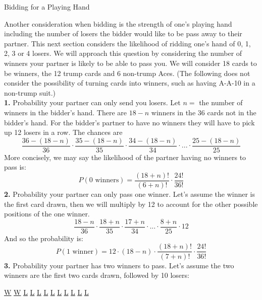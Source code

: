 \documentclass[11pt]{article}
\begin{document}
\begin{center}
  Bidding for a Playing Hand
\end{center}
\indent
Another consideration when bidding is the strength of one's playing hand including the number of losers the bidder would like to be pass away to their partner. This next section considers the likelihood of ridding one's hand of 0, 1, 2, 3 or 4 losers. We will approach this question by considering the number of winners your partner is likely to be able to pass you. We will consider 18 cards to be winners, the 12 trump cards and 6 non-trump Aces. (The following does not consider the possibility of turning cards into winners, such as having A-A-10 in a non-trump suit.)\\
\indent \textbf{\textbf{1.}} Probability your partner can only send you losers. Let $n=$ the number of winners in the bidder's hand. There are $18-n$ winners in the 36 cards not in the bidder's hand. For the bidder's partner to have no winners they will have to pick up 12 losers in a row. The chances are
\begin{equation}
  \frac{36-(18-n)}{36} \cdot \frac{35-(18-n)}{35}\cdot \frac{34-(18-n)}{34}\cdot ...\cdot \frac{25-(18-n)}{25}
\end{equation}
More concisely, we may say the likelihood of the partner having no winners to pass is:
\begin{equation}
 P(0\text{ winners})= \frac{(18+n)!}{(6+n)!}\cdot \frac{24!}{36!}
\end{equation}
\indent \textbf{2.} Probability your partner can only pass one winner. Let's assume the winner is the first card drawn, then we will multiply by 12 to account for the other possible positions of the one winner.
\begin{equation}
\frac{18-n}{36}\cdot \frac{18+n}{35}\cdot \frac {17+n}{34}\cdot ...\cdot \frac{8+n}{25} \cdot 12
\end {equation}
And so the probability is:
\begin{equation}
 P(1 \text{ winner})= 12\cdot (18-n)\cdot \frac{(18+n)!}{(7+n)!}\cdot \frac{24!}{36!}
\end{equation}
\indent
\textbf{3.} Probability your partner has two winners to pass. Let's assume the two winners are the first two cards drawn, followed by 10 losers:\\
\begin {center}
\underline{W} \underline{W} \underline{L} \underline{L} \underline{L} \underline{L} \underline{L} \underline{L} \underline{L} \underline{L} \underline{L} \underline{L}
\end {center}
\end{document}
